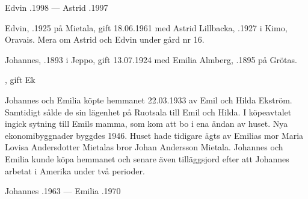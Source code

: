 Edvin .1998  ---  Astrid .1997


%

%
Edvin, .1925 på Mietala, gift  18.06.1961 med Astrid Lillbacka, .1927 i Kimo, Oravais. Mera om Astrid och Edvin under gård nr 16.\jhvspace{}



%
Johannes, .1893 i Jeppo,  gift 13.07.1924 med Emilia Almberg, .1895 på Grötas.
\begin{jhchildren}
  \item {}
  \item {}, gift Ek
\end{jhchildren}

Johannes och Emilia köpte hemmanet 22.03.1933 av Emil och Hilda Ekström. Samtidigt sålde de sin lägenhet på  Ruotsala till Emil och Hilda. I köpeavtalet ingick sytning till Emils mamma, som kom att bo i ena ändan av huset. Nya ekonomibyggnader byggdes 1946. Huset hade tidigare ägts av Emilias mor Maria Lovisa Andersdotter Mietalas bror Johan Andersson Mietala. Johannes och Emilia kunde köpa hemmanet och senare även tilläggsjord efter att Johannes arbetat i Amerika under två perioder.

Johannes .1963  ---  Emilia .1970


